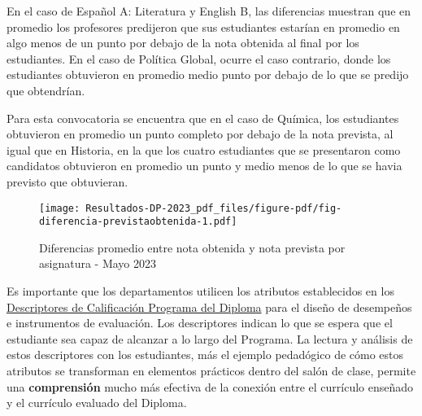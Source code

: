 \documentclass[
  letterpaper,
  DIV=11,
  numbers=noendperiod]{scrartcl}
\begin{document}
En el caso de Español A: Literatura y English B, las diferencias
muestran que en promedio los profesores predijeron que sus estudiantes
estarían en promedio en algo menos de un punto por debajo de la nota
obtenida al final por los estudiantes. En el caso de Política Global,
ocurre el caso contrario, donde los estudiantes obtuvieron en promedio
medio punto por debajo de lo que se predijo que obtendrían.

Para esta convocatoria se encuentra que en el caso de Química, los
estudiantes obtuvieron en promedio un punto completo por debajo de la
nota prevista, al igual que en Historia, en la que los cuatro
estudiantes que se presentaron como candidatos obtuvieron en promedio un
punto y medio menos de lo que se havia previsto que obtuvieran.

\begin{figure}

{\centering \texttt{[image: Resultados-DP-2023\_pdf\_files/figure-pdf/fig-diferencia-previstaobtenida-1.pdf]}

}

\caption{\label{fig-diferencia-previstaobtenida}Diferencias promedio
entre nota obtenida y nota prevista por asignatura - Mayo 2023}

\end{figure}

\begin{tcolorbox}[enhanced jigsaw, colbacktitle=quarto-callout-tip-color!10!white, toprule=.15mm, colback=white, toptitle=1mm, leftrule=.75mm, rightrule=.15mm, left=2mm, arc=.35mm, colframe=quarto-callout-tip-color-frame, breakable, bottomtitle=1mm, titlerule=0mm, opacityback=0, title=\textcolor{quarto-callout-tip-color}{\faLightbulb}\hspace{0.5em}{Tip}, coltitle=black, opacitybacktitle=0.6, bottomrule=.15mm]
Es importante que los departamentos utilicen los atributos establecidos
en los
\href{/Users/JorgeEd/OneDrive\%20-\%20Gimnasio\%20Colombo\%20Británico/Descriptores\%20de\%20calificaciones\%20finales\%20del\%20Programa\%20del\%20Diploma.pdf}{Descriptores
de Calificación Programa del Diploma} para el diseño de desempeños e
instrumentos de evaluación. Los descriptores indican lo que se espera
que el estudiante sea capaz de alcanzar a lo largo del Programa. La
lectura y análisis de estos descriptores con los estudiantes, más el
ejemplo pedadógico de cómo estos atributos se transforman en elementos
prácticos dentro del salón de clase, permite una \textbf{comprensión}
mucho más efectiva de la conexión entre el currículo enseñado y el
currículo evaluado del Diploma.
\end{tcolorbox}
\end{document}
